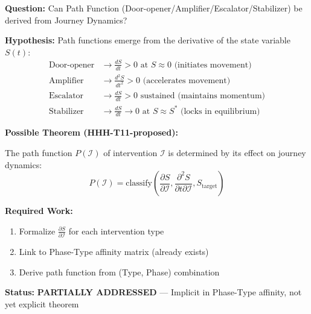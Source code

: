 \begin{tcolorbox}[colback=yellow!5!white, colframe=yellow!75!black,
    title=\textbf{Research Question RQ-3: Path Function Emergence (F14)}]

\textbf{Question:} Can Path Function (Door-opener/Amplifier/Escalator/Stabilizer) be derived from Journey Dynamics?

\textbf{Hypothesis:} Path functions emerge from the derivative of the state variable $S(t)$:
\begin{align}
\text{Door-opener} &\rightarrow \frac{dS}{dt} > 0 \text{ at } S \approx 0 \text{ (initiates movement)} \\
\text{Amplifier} &\rightarrow \frac{d^2S}{dt^2} > 0 \text{ (accelerates movement)} \\
\text{Escalator} &\rightarrow \frac{dS}{dt} > 0 \text{ sustained (maintains momentum)} \\
\text{Stabilizer} &\rightarrow \frac{dS}{dt} \rightarrow 0 \text{ at } S \approx S^* \text{ (locks in equilibrium)}
\end{align}

\textbf{Possible Theorem (HHH-T11-proposed):}

The path function $P(\mathcal{I})$ of intervention $\mathcal{I}$ is determined by its effect on journey dynamics:
\begin{equation}
P(\mathcal{I}) = \text{classify}\left(\frac{\partial S}{\partial \mathcal{I}}, \frac{\partial^2 S}{\partial t \partial \mathcal{I}}, S_{\text{target}}\right)
\end{equation}

\textbf{Required Work:}
\begin{enumerate}[nosep]
    \item Formalize $\frac{\partial S}{\partial \mathcal{I}}$ for each intervention type
    \item Link to Phase-Type affinity matrix (already exists)
    \item Derive path function from (Type, Phase) combination
\end{enumerate}

\textbf{Status:} \textcolor{yellow!60!black}{\textbf{PARTIALLY ADDRESSED}} --- Implicit in Phase-Type affinity, not yet explicit theorem
\end{tcolorbox}


